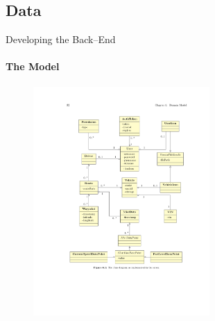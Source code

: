     \subsection{Data}
        \begin{frame}[t]{Developing the Back--End}\framesubtitle{The Model}
             {
            \begin{figure}[htb]
                \centering
                \includegraphics[width=0.60\textwidth, trim={4.2cm 6.0cm 2.5cm 3.5cm},clip]{class.pdf}
            \end{figure}
            }


\end{frame}
